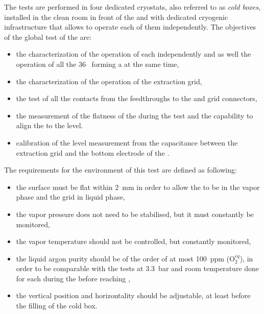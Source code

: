 The tests are performed in four dedicated cryostats, also referred to as \emph{cold boxes}, installed in the clean room in front of the  and with dedicated cryogenic infrastructure that allows to operate each of them independently.
The objectives of the global test of the  are:
\begin{itemize}
\item the characterization of the  operation of each  independently and as well the  operation of all the 36~ forming a  at the same time,
\item the characterization of the  operation of the extraction grid,
\item the test of all the  contacts from the feedthroughs to the  and grid connectors,
\item the measurement of the flatness of the  during the test and the capability to align the  to the  level.
\item calibration of the level measurement from the capacitance between the extraction grid and the bottom electrode of the .
\end{itemize}

The requirements for the environment of this test are defined as following:
\begin{itemize}
\item the  surface must be flat within 2~mm in order to allow the  to be in the vapor phase and the grid in liquid phase,
\item the vapor pressure does not need to be stabilised, but it must constantly be monitored,
\item the vapor temperature should not be controlled, but constantly monitored,
\item the liquid argon purity should be of the order of at most 100~ppm (O$_2^{eq}$), in order to be comparable with the tests at 3.3~bar and room temperature done for each  during the  before reaching \surf,
\item the  vertical position and horizontality should be adjustable, at least before the filling of the cold box.
\end{itemize}

